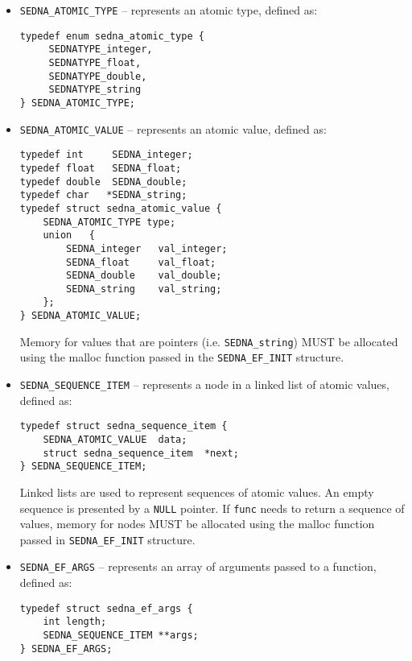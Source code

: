 \documentclass[a4paper,12pt]{article}
\begin{document}
\begin{itemize}
\item \verb!SEDNA_ATOMIC_TYPE! -- represents an atomic type, defined as:
\begin{verbatim}
typedef enum sedna_atomic_type {
     SEDNATYPE_integer,
     SEDNATYPE_float,
     SEDNATYPE_double,
     SEDNATYPE_string
} SEDNA_ATOMIC_TYPE;
\end{verbatim}

\item \verb!SEDNA_ATOMIC_VALUE! -- represents an atomic value, defined as:
\begin{verbatim}
typedef int     SEDNA_integer;
typedef float   SEDNA_float;
typedef double  SEDNA_double;
typedef char   *SEDNA_string;
typedef struct sedna_atomic_value {
    SEDNA_ATOMIC_TYPE type;
    union	{
        SEDNA_integer   val_integer;
        SEDNA_float     val_float;
        SEDNA_double    val_double;
        SEDNA_string    val_string;
    };
} SEDNA_ATOMIC_VALUE;
\end{verbatim}

Memory for values that are pointers (i.e. \verb!SEDNA_string!) MUST be allocated
using the malloc function passed in the \verb!SEDNA_EF_INIT! structure.

\item \verb!SEDNA_SEQUENCE_ITEM! -- represents a node in a linked list of atomic
values, defined as:
\begin{verbatim}
typedef struct sedna_sequence_item {
    SEDNA_ATOMIC_VALUE	data;
    struct sedna_sequence_item	*next;
} SEDNA_SEQUENCE_ITEM;
\end{verbatim}

Linked lists are used to represent sequences of atomic values. An empty sequence
is presented by a \verb!NULL! pointer. If \verb!func! needs to return a sequence
of values, memory for nodes MUST be allocated using the malloc function passed
in \verb!SEDNA_EF_INIT! structure.

\item \verb!SEDNA_EF_ARGS! -- represents an array of arguments passed to a
function, defined as:
\begin{verbatim}
typedef struct sedna_ef_args {
    int length;
    SEDNA_SEQUENCE_ITEM **args;
} SEDNA_EF_ARGS;
\end{verbatim}
\end{itemize}
\end{document}
